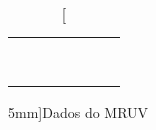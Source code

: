 \begin{table*}[!ht]
\begin{tabular}{lp{25mm}p{25mm}p{25mm}p{25mm}p{25mm}l}
        & \cellcolor[gray]{0.89} & \cellcolor[gray]{0.92} \\ 
        & \cellcolor[gray]{0.95} & \cellcolor[gray]{0.97} \\ 
        & \cellcolor[gray]{0.89} & \cellcolor[gray]{0.92} \\ 
        & \cellcolor[gray]{0.95} & \cellcolor[gray]{0.97} \\ 
        & \cellcolor[gray]{0.89} & \cellcolor[gray]{0.92} \\ 
        & \cellcolor[gray]{0.95} & \cellcolor[gray]{0.97} \\ 
        & \cellcolor[gray]{0.89} & \cellcolor[gray]{0.92} \\ 
        & \cellcolor[gray]{0.95} & \cellcolor[gray]{0.97} \\ 
        \cmidrule{2-3}
    \bottomrule
    \end{tabular}
    \caption[][5mm]{Dados do MRUV}
    \label{DadosRodaDeMaxwell}
    \end{table*}